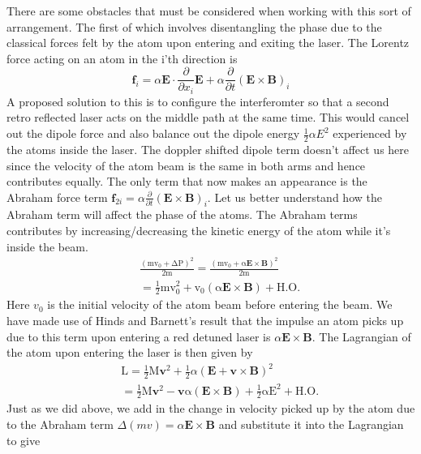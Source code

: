 \documentclass[twocolumn,english,pra,aps,superscriptaddress,floatfix]{revtex4-1}
\begin{document}
There are some obstacles that must be considered when working with this sort of arrangement.  The first of which involves disentangling the phase due to the classical forces felt by the atom upon entering and exiting the laser.  The Lorentz force acting on an atom in the i'th direction is
\begin{equation}
\mathbf{f}_i= \alpha\mathbf{E}\cdot\frac{\partial}{\partial x_i}\mathbf{E}+\alpha\frac{\partial}{\partial t}\left(\mathbf{E}\times\mathbf{B}\right)_i
\label{lorentz4}
\end{equation}
A proposed solution to this is to configure the interferomter so that a second retro reflected laser acts on the middle path at the same time.  This would cancel out the dipole force and also balance out the dipole energy $\frac{1}{2}\alpha E^2$ experienced by the atoms inside the laser.  
The doppler shifted dipole term doesn't affect us here since the velocity of the atom beam is the same in both arms and hence contributes equally.  The only term that now makes an appearance is the Abraham force term $\mathbf{f}_{2i}= \alpha\frac{\partial}{\partial t}\left(\mathbf{E}\times\mathbf{B}\right)_i$.  Let us better understand how the Abraham term will affect the phase of the atoms.  The Abraham terms contributes by increasing/decreasing the kinetic energy of the atom while it's inside the beam.
\begin{eqnarray}
&&\mathrm{\frac{(mv_0+ \Delta P)^2}{2m}=\frac{(mv_0+\alpha\mathbf{E}\times\mathbf{B})^2}{2m}} \nonumber \\
&&\mathrm{=\frac{1}{2}mv_0^2+v_0(\alpha\mathbf{E}\times\mathbf{B}) +H.O.}
\end{eqnarray}
Here $v_0$ is the initial velocity of the atom beam before entering the beam.  We have made use of Hinds and Barnett's result \cite{hinds} that the impulse an atom picks up due to this term upon entering a red detuned laser is $\alpha\mathbf{E}\times\mathbf{B}$. The Lagrangian of the atom upon entering the laser is then given by
\begin{eqnarray}
&&\mathrm{L}=\frac{1}{2}\mathrm{M}\mathbf{v}^2 + \frac{1}{2}\alpha\left(\mathbf{E} +\mathbf{v}\times\mathbf{B}\right)^2 \nonumber \\
&&=\frac{1}{2}\mathrm{M\mathbf{v}^2 - \mathbf{v}\alpha(\mathbf{E}\times\mathbf{B})+\frac{1}{2}\alpha E^2 +H.O.}
\label{lagrangian3}
\end{eqnarray}
Just as we did above, we add in the change in velocity picked up by the atom due to the Abraham term $\Delta(mv)=\alpha\mathbf{E}\times\mathbf{B}$ and substitute it into the Lagrangian to give
\end{document}
